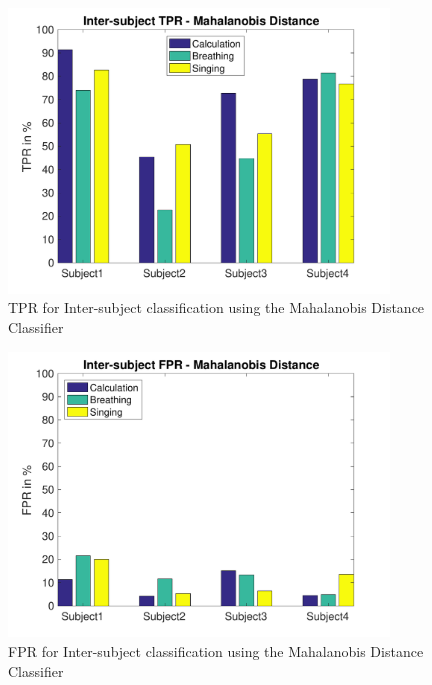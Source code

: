     	\begin{figure}[hbtp]
	    	\centering
	    	\includegraphics[width=0.90\textwidth]{Chapter-4/base_tprim}
	    	\caption{TPR for Inter-subject classification using the Mahalanobis Distance Classifier}
	    	\label{fig:chap4InterMTPR}
    	\end{figure}

    	\begin{figure}[hbtp]
	    	\centering
	    	\includegraphics[width=0.90\textwidth]{Chapter-4/base_fprim}
	    	\caption{FPR for Inter-subject classification using the Mahalanobis Distance Classifier}
	    	\label{fig:chap4InterMFPR}
    	\end{figure}


